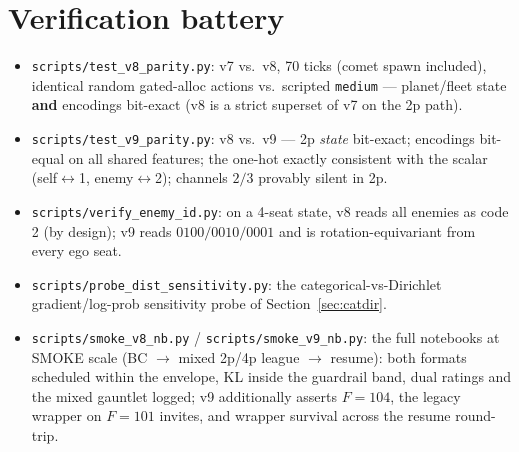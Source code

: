 \documentclass[11pt]{article}
\newcommand{\cd}[1]{\texttt{#1}}
\begin{document}
\section{Verification battery}\label{sec:verify}
\begin{itemize}[nosep,leftmargin=1.6em]
\item \cd{scripts/test\_v8\_parity.py}: v7 vs.\ v8, 70 ticks (comet spawn included), identical random
  gated-alloc actions vs.\ scripted \cd{medium} --- planet/fleet state \textbf{and} encodings bit-exact
  (v8 is a strict superset of v7 on the 2p path).
\item \cd{scripts/test\_v9\_parity.py}: v8 vs.\ v9 --- 2p \emph{state} bit-exact; encodings bit-equal on
  all shared features; the one-hot exactly consistent with the scalar
  (self$\leftrightarrow$1, enemy$\leftrightarrow$2); channels $2/3$ provably silent in 2p.
\item \cd{scripts/verify\_enemy\_id.py}: on a 4-seat state, v8 reads all enemies as code 2 (by design);
  v9 reads $0100/0010/0001$ and is rotation-equivariant from every ego seat.
\item \cd{scripts/probe\_dist\_sensitivity.py}: the categorical-vs-Dirichlet gradient/log-prob
  sensitivity probe of Section~\ref{sec:catdir}.
\item \cd{scripts/smoke\_v8\_nb.py} / \cd{scripts/smoke\_v9\_nb.py}: the full notebooks at SMOKE scale
  (BC $\to$ mixed 2p/4p league $\to$ resume): both formats scheduled within the envelope, KL inside the
  guardrail band, dual ratings and the mixed gauntlet logged; v9 additionally asserts $F{=}104$, the
  legacy wrapper on $F{=}101$ invites, and wrapper survival across the resume round-trip.
\end{itemize}

\end{document}
